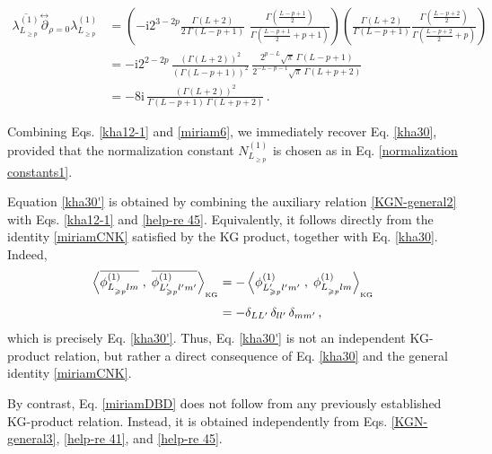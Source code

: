 \documentclass[aps,twocolumn,nofootinbib]{revtex4}
\begin{document}
{\begin{appendix}
\begin{widetext}
\begin{align}\label{kha12-1}
    \overline{\lambda_{L^{}_{\geqslant p}}^{(1)}} \stackrel{\leftrightarrow}{\partial}_{\rho=0} \lambda_{L^{}_{\geqslant p}}^{(1)} &= \left(-\mathrm{i} 2^{3-2p} \frac{\Gamma(L+2)}{2\,\Gamma(L-p+1)}\,\,\frac{\Gamma\left(\frac{L-p+1}{2}\right)}{\Gamma\left(\frac{L-p+1}{2}+p+1\right)}\right)\left(\frac{\Gamma(L+2)}{\Gamma(L-p+1)}
    \frac{\Gamma\!\left(\frac{L-p+2}{2}\right)}{\Gamma\!\left(\frac{L-p+2}{2}+p\right)}\right) \nonumber\\[3pt]
    &= -\mathrm{i} 2^{2-2p} \,\frac{\left(\Gamma(L+2)\right)^2}{\left(\Gamma(L-p+1)\right)^2} \,\frac{2^{p-L}\sqrt{\pi}\,\Gamma(L-p+1)}{2^{-L-p-1}\sqrt{\pi}\,\Gamma(L+p+2)} \nonumber\\[3pt]
    &= -8\mathrm{i}\,\frac{\left(\Gamma(L+2)\right)^2}{\Gamma(L-p+1)\, \Gamma(L+p+2)}\,.
\end{align}
\end{widetext}
Combining Eqs. \eqref{kha12-1} and \eqref{miriam6}, we immediately recover Eq. \eqref{kha30}, provided that the normalization constant $N^{(1)}_{L^{}_{\geqslant p}}$ is chosen as in Eq. \eqref{normalization constants1}.

Equation \eqref{kha30'} is obtained by combining the auxiliary relation \eqref{KGN-general2} with Eqs. \eqref{kha12-1} and \eqref{help-re 45}. Equivalently, it follows directly from the identity \eqref{miriamCNK} satisfied by the KG product, together with Eq. \eqref{kha30}. Indeed,
\begin{align}
     \left\langle \overline{\phi^{(1)}_{L^{}_{\geqslant p}lm}} \;,\; \overline{\phi^{(1)}_{L^\prime_{\geqslant p}l^\prime_{}m^\prime_{}}}\right\rangle_{\vphantom{}_{\text{KG}}} &= - \left\langle {\phi^{(1)}_{L^{\prime}_{\geqslant p}l^\prime m^\prime}} \;,\; {\phi^{(1)}_{L^{}_{\geqslant p}lm}}\right\rangle_{\vphantom{}_{\text{KG}}}\nonumber\\[3pt] 
     &= - \delta_{LL_{}^\prime} \,\delta_{ll_{}^\prime} \,\delta_{mm_{}^\prime}\,,
\end{align}
which is precisely Eq. \eqref{kha30'}. Thus, Eq. \eqref{kha30'} is not an independent KG-product relation, but rather a direct consequence of Eq. \eqref{kha30} and the general identity \eqref{miriamCNK}.

By contrast, Eq. \eqref{miriamDBD} does not follow from any previously established KG-product relation. Instead, it is obtained independently from Eqs. \eqref{KGN-general3}, \eqref{help-re 41}, and \eqref{help-re 45}.



\end{appendix}}
\end{document}

